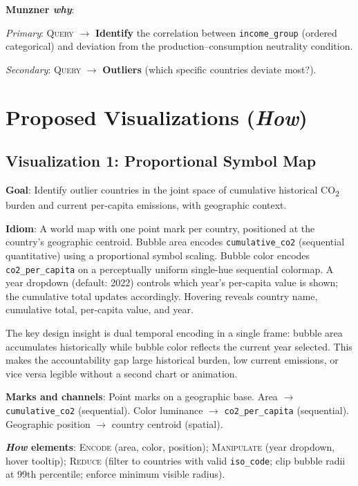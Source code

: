 \documentclass[10pt]{article}
\begin{document}
\textbf{Munzner \emph{why}}: 

\textit{Primary}: \textsc{Query} $\rightarrow$ \textbf{Identify} the correlation between \texttt{income\_group} (ordered categorical) and deviation from the production--consumption neutrality condition.

\textit{Secondary}: \textsc{Query} $\rightarrow$ \textbf{Outliers} (which specific countries deviate most?).

\section{Proposed Visualizations (\emph{How})}
\label{sec:how}

\subsection{Visualization 1: Proportional Symbol Map}

\textbf{Goal}: Identify outlier countries in the joint space of cumulative historical CO\textsubscript{2} burden and current per-capita emissions, with geographic context.

\textbf{Idiom}: A world map with one point mark per country, positioned at the country's geographic centroid. Bubble area encodes \texttt{cumulative\_co2} (sequential quantitative) using a proportional symbol scaling. Bubble color encodes \texttt{co2\_per\_capita} on a perceptually uniform single-hue sequential colormap. A year dropdown (default: 2022) controls which year's per-capita value is shown; the cumulative total updates accordingly. Hovering reveals country name, cumulative total, per-capita value, and year.

The key design insight is dual temporal encoding in a single frame: bubble area accumulates historically while bubble color reflects the current year selected. This makes the accountability gap large historical burden, low current emissions, or vice versa legible without a second chart or animation.

\textbf{Marks and channels}: Point marks on a geographic base. Area $\rightarrow$ \texttt{cumulative\_co2} (sequential). Color luminance $\rightarrow$ \texttt{co2\_per\_capita} (sequential). Geographic position $\rightarrow$ country centroid (spatial).

\textbf{\emph{How} elements}: \textsc{Encode} (area, color, position); \textsc{Manipulate} (year dropdown, hover tooltip); \textsc{Reduce} (filter to countries with valid \texttt{iso\_code}; clip bubble radii at 99th percentile; enforce minimum visible radius).
\end{document}
